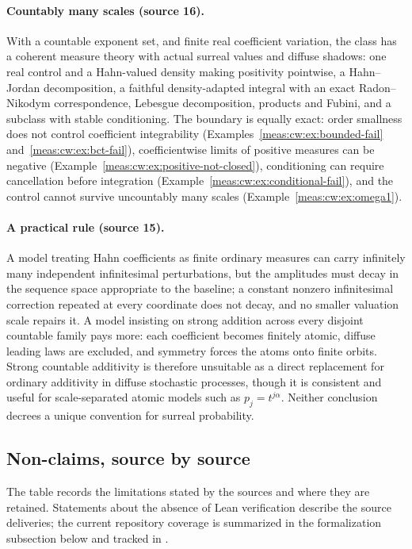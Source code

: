 \documentclass[11pt]{article}
\numberwithin{equation}{section}
\theoremstyle{definition}
\theoremstyle{remark}
\begin{document}
\paragraph{Countably many scales (source 16).} With a countable exponent set, and
finite real coefficient variation, the class has a coherent measure theory with
actual surreal values and diffuse shadows: one real control and a Hahn-valued
density making positivity pointwise, a Hahn--Jordan decomposition, a faithful
density-adapted integral with an exact Radon--Nikodym correspondence, Lebesgue
decomposition, products and Fubini, and a subclass with stable conditioning. The
boundary is equally exact: order smallness does not control coefficient
integrability (Examples~\ref{meas:cw:ex:bounded-fail}
and~\ref{meas:cw:ex:bct-fail}), coefficientwise limits of positive measures can be
negative (Example~\ref{meas:cw:ex:positive-not-closed}), conditioning can require
cancellation before integration (Example~\ref{meas:cw:ex:conditional-fail}), and
the control cannot survive uncountably many scales
(Example~\ref{meas:cw:ex:omega1}).

\paragraph{A practical rule (source 15).} A model treating Hahn coefficients as
finite ordinary measures can carry infinitely many independent infinitesimal
perturbations, but the amplitudes must decay in the sequence space appropriate
to the baseline; a constant nonzero infinitesimal correction repeated at every
coordinate does not decay, and no smaller valuation scale repairs it. A model
insisting on strong addition across every disjoint countable family pays more:
each coefficient becomes finitely atomic, diffuse leading laws are excluded, and
symmetry forces the atoms onto finite orbits. Strong countable additivity is
therefore unsuitable as a direct replacement for ordinary additivity in diffuse
stochastic processes, though it is consistent and useful for scale-separated
atomic models such as $p_j=t^{j\alpha}$. Neither conclusion decrees a unique
convention for surreal probability.

\subsection{Non-claims, source by source}\label{meas:sub:nonclaims}

The table records the limitations stated by the sources and where they
are retained. Statements about the absence of Lean verification describe the
source deliveries; the current repository coverage is summarized in the
formalization subsection below and tracked in .
\end{document}
